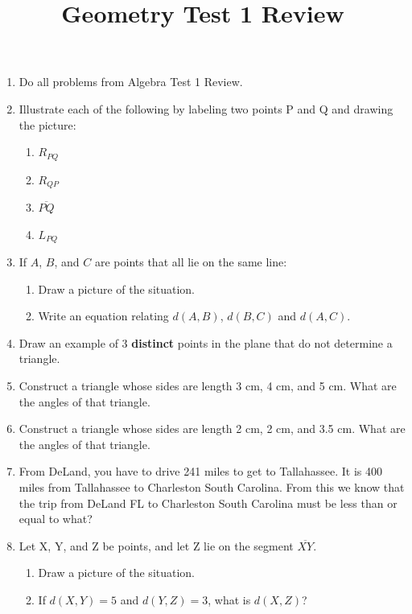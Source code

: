 \documentclass{article}
\title{Geometry Test 1 Review}
\begin{document}
{}
\begin{multicols}{2}
\begin{enumerate}
\item Do all problems from Algebra Test 1 Review.
\item Illustrate each of the following by labeling two points P and Q and drawing the picture:
\begin{enumerate}
	\item $R_{PQ}$
	\item $R_{QP}$
	\item $\overline{PQ}$
	\item $L_{PQ}$
\end{enumerate}
\item If $A$, $B$, and $C$ are points that all lie on the same line:
\begin{enumerate}
	\item Draw a picture of the situation.
	\item Write an equation relating $d(A,B)$, $d(B,C)$ and $d(A,C)$.
\end{enumerate}
\item Draw an example of 3 \textbf{distinct} points in the plane that do not determine a triangle.
\item Construct a triangle whose sides are length 3 cm, 4 cm, and 5 cm.  What are the angles of that triangle.
\item Construct a triangle whose sides are length 2 cm, 2 cm, and 3.5 cm.  What are the angles of that triangle.
\item From DeLand, you have to drive 241 miles to get to Tallahassee.  It is 400 miles from Tallahassee to Charleston South Carolina.  From this we know that the trip from DeLand FL to Charleston South Carolina must be less than or equal to what?
\item Let X, Y, and Z be points, and let Z lie on the segment $\overline{XY}$.
\begin{enumerate}
	\item Draw a picture of the situation.
	\item If $d(X,Y)=5$ and $d(Y,Z)=3$, what is $d(X,Z)$?
\end{enumerate}

\end{enumerate}
\end{multicols}
\end{document}
